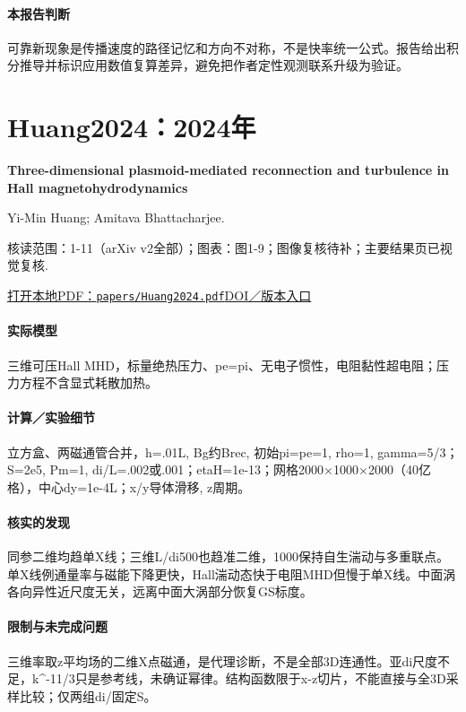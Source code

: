 \paragraph{本报告判断}可靠新现象是传播速度的路径记忆和方向不对称，不是快率统一公式。报告给出积分推导并标识应用数值复算差异，避免把作者定性观测联系升级为验证。

\section{Huang2024：2024年}\label{paper:Huang2024}

\textbf{Three-dimensional plasmoid-mediated reconnection and turbulence in Hall magnetohydrodynamics}\citep{Huang2024}\

Yi-Min Huang;  Amitava Bhattacharjee.

\textsf{核读范围：}1-11（arXiv v2全部）；\textsf{图表：}图1-9；图像复核待补；主要结果页已视觉复核.

\href{run:papers/Huang2024.pdf}{打开本地PDF：\texttt{papers/Huang2024.pdf}}\quad\href{https://doi.org/10.1063/5.0216561}{DOI／版本入口}

\paragraph{实际模型}三维可压Hall MHD，标量绝热压力、pe=pi、无电子惯性，电阻黏性超电阻；压力方程不含显式耗散加热。

\paragraph{计算／实验细节}立方盒、两磁通管合并，h=.01L, Bg约Brec, 初始pi=pe=1, rho=1, gamma=5/3；S=2e5, Pm=1, di/L=.002或.001；etaH=1e-13；网格2000×1000×2000（40亿格），中心dy=1e-4L；x/y导体滑移, z周期。

\paragraph{核实的发现}同参二维均趋单X线；三维L/di500也趋准二维，1000保持自生湍动与多重联点。单X线例通量率与磁能下降更快，Hall湍动态快于电阻MHD但慢于单X线。中面涡各向异性近尺度无关，远离中面大涡部分恢复GS标度。

\paragraph{限制与未完成问题}三维率取z平均场的二维X点磁通，是代理诊断，不是全部3D连通性。亚di尺度不足，k\textasciicircum{}-11/3只是参考线，未确证幂律。结构函数限于x-z切片，不能直接与全3D采样比较；仅两组di/固定S。

